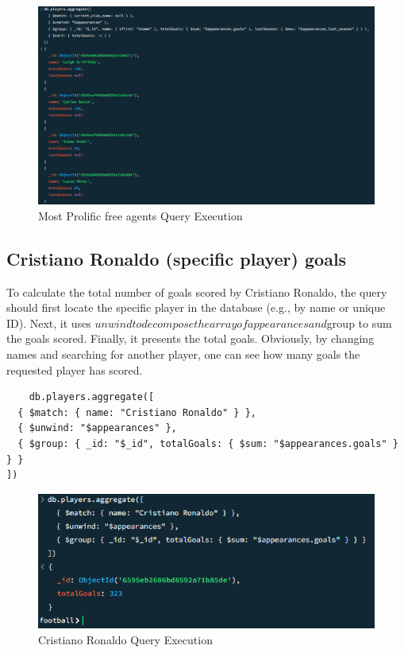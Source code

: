 \documentclass{Configuration_Files/PoliMi3i_thesis}
\begin{document}
\begin{figure}[htbp]
    \centering
    \includegraphics[scale=0.7]{Images/Queries/Most_prolific_free_agents/mpfa.png}
    \caption{Most Prolific free agents Query Execution}
\end{figure}


\subsection{Cristiano Ronaldo (specific player) goals }
To calculate the total number of goals scored by Cristiano Ronaldo, the query should first locate the specific player in the database (e.g., by name or unique ID). Next, it uses $unwind to decompose the array of appearances and $group to sum the goals scored. Finally, it presents the total goals.
Obviously, by changing names and searching for another player, one can see how many goals the requested player has scored.
\begin{verbatim}
    db.players.aggregate([
  { $match: { name: "Cristiano Ronaldo" } },
  { $unwind: "$appearances" },
  { $group: { _id: "$_id", totalGoals: { $sum: "$appearances.goals" } } }
])
\end{verbatim}
\begin{figure}[htbp]
    \centering
    \includegraphics[scale=1]{Images/Queries/Cristiano_Ronaldo_goals/CRG.png}
    \caption{Cristiano Ronaldo Query Execution}
\end{figure}
\newpage
\end{document}
